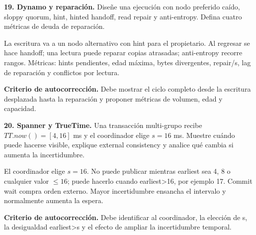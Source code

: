 \documentclass[variant=guiaresuelta,cover=institutional,mode=screen]{ua-engineering-v6-article}
\begin{document}
\begin{uaexercise}
\textbf{19. Dynamo y reparación.} Diseñe una ejecución con nodo preferido caído, sloppy quorum, hint, hinted handoff, read repair y anti-entropy. Defina cuatro métricas de deuda de reparación.
\end{uaexercise}
\begin{uaanswer}
La escritura va a un nodo alternativo con hint para el propietario. Al regresar se hace handoff; una lectura puede reparar copias atrasadas; anti-entropy recorre rangos. Métricas: hints pendientes, edad máxima, bytes divergentes, repair/s, lag de reparación y conflictos por lectura.

\par\smallskip\textbf{Criterio de autocorrección.} Debe mostrar el ciclo completo desde la escritura desplazada hasta la reparación y proponer métricas de volumen, edad y capacidad.
\end{uaanswer}

\begin{uaexercise}
\textbf{20. Spanner y TrueTime.} Una transacción multi-grupo recibe $TT.now()=[4,16]$ ms y el coordinador elige $s=16$ ms. Muestre cuándo puede hacerse visible, explique external consistency y analice qué cambia si aumenta la incertidumbre.
\end{uaexercise}
\begin{uaanswer}
El coordinador elige $s=16$. No puede publicar mientras earliest sea 4, 8 o cualquier valor $\le16$; puede hacerlo cuando earliest>16, por ejemplo 17. Commit wait compra orden externo. Mayor incertidumbre ensancha el intervalo y normalmente aumenta la espera.

\par\smallskip\textbf{Criterio de autocorrección.} Debe identificar al coordinador, la elección de s, la desigualdad earliest>s y el efecto de ampliar la incertidumbre temporal.
\end{uaanswer}
\end{document}
